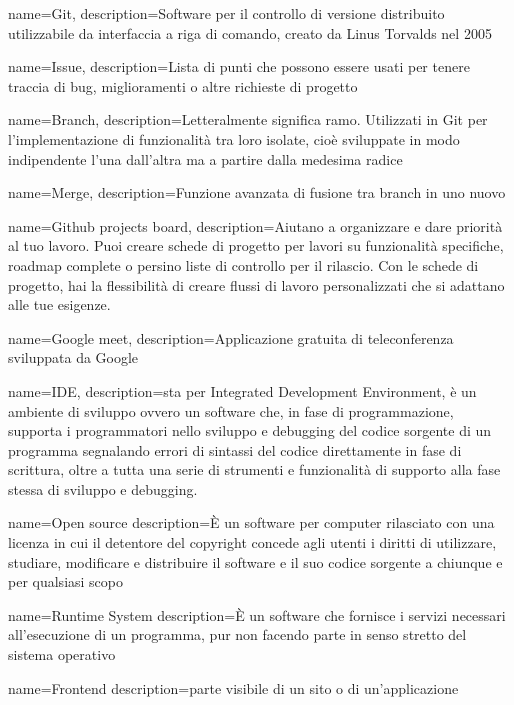 {
	name={Git},
	description={Software per il controllo di versione distribuito utilizzabile da interfaccia a riga di comando, creato da Linus Torvalds nel 2005}
}

{
	name={Issue},
	description={Lista di punti che possono essere usati per tenere traccia di bug, miglioramenti o altre richieste di progetto}
}

{
	name={Branch},
	description={Letteralmente significa ramo. Utilizzati in Git per l'implementazione di funzionalità tra loro isolate, cioè sviluppate in modo indipendente l'una dall'altra ma a partire dalla medesima radice}
}

{
	name={Merge},
	description={Funzione avanzata di fusione tra branch in uno nuovo}
}

{
	name={Github projects board},
	description={Aiutano a organizzare e dare priorità al tuo lavoro. Puoi creare schede di progetto per lavori su funzionalità specifiche, roadmap complete o persino liste di controllo per il rilascio. Con le schede di progetto, hai la flessibilità di creare flussi di lavoro personalizzati che si adattano alle tue esigenze.}
}

{
	name={Google meet},
	description={Applicazione gratuita di teleconferenza sviluppata da Google}
}

{
	name={IDE},
	description={sta per Integrated Development Environment, è un ambiente di sviluppo ovvero un software che, in fase di programmazione, supporta i programmatori nello sviluppo e debugging del codice sorgente di un programma segnalando errori di sintassi del codice direttamente in fase di scrittura, oltre a tutta una serie di strumenti e funzionalità di supporto alla fase stessa di sviluppo e debugging.}
}

{
	name={Open source}
	description={È un software per computer rilasciato con una licenza in cui il detentore del copyright concede agli utenti i diritti di utilizzare, studiare, modificare e distribuire il software e il suo codice sorgente a chiunque e per qualsiasi scopo}
}

{
	name={Runtime System}
	description={È un software che fornisce i servizi necessari all'esecuzione di un programma, pur non facendo parte in senso stretto del sistema operativo}
}

{
	name={Frontend}
	description={parte visibile di un sito o di un’applicazione}
}

